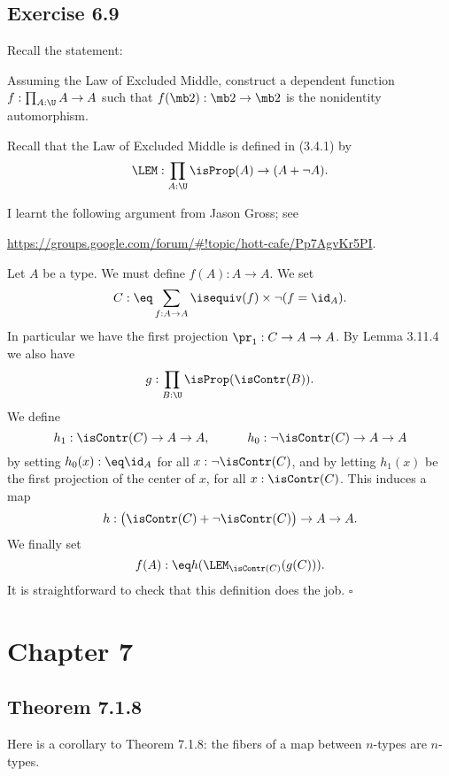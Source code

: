 \documentclass[12pt]{article}
\begin{document}


\subsection{Exercise 6.9}


Recall the statement:

Assuming the Law of Excluded Middle, construct a dependent function $f:\prod_{A:\U}A\to A$ such that $f(\mb2):\mb2\to\mb2$ is the nonidentity automorphism.

Recall that the Law of Excluded Middle is defined in (3.4.1) by 
$$
\LEM:\prod_{A:\U}\isProp(A)\to(A+\neg A).
$$ 

I learnt the following argument from Jason Gross; see 

\nn\href{https://groups.google.com/forum/#!topic/hott-cafe/Pp7AgvKr5PI}{https://groups.google.com/forum/\#!topic/hott-cafe/Pp7AgvKr5PI}.

Let $A$ be a type. We must define $f(A):A\to A$. We set 
$$
C:\eq\sum_{f:A\to A}\isequiv(f)\times\neg(f=\id_A).
$$ 
In particular we have the first projection $\pr_1:C\to A\to A$. By Lemma 3.11.4 we also have 
$$
g:\prod_{B:\U}\isProp(\isContr(B)).
$$ 
We define 
$$
h_1:\isContr(C)\to A\to A,\qquad\quad h_0:\neg\isContr(C)\to A\to A
$$ 
by setting $h_0(x):\eq\id_A$ for all $x:\neg\isContr(C)$, and by letting $h_1(x)$ be the first projection of the center of $x$, for all $x:\isContr(C)$. This induces a map 
$$
h:\big(\isContr(C)+\neg\isContr(C)\big)\to A\to A.
$$ 
We finally set 
$$
f(A):\eq h(\LEM_{\isContr(C)}(g(C))).
$$
It is straightforward to check that this definition does the job. $\square$


\section{Chapter 7}


\subsection{Theorem 7.1.8}\label{718}

Here is a corollary to Theorem 7.1.8: the fibers of a map between $n$-types are $n$-types.
\end{document}
